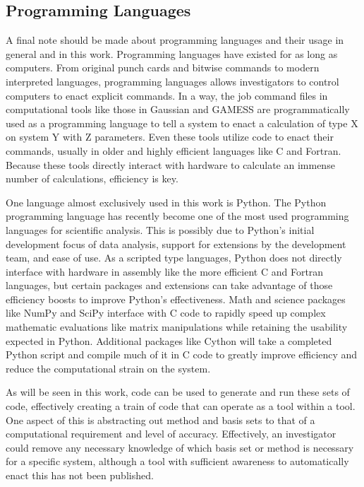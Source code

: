 \subsection{Programming Languages}

A final note should be made about programming languages and their usage in general and in this work.
Programming languages have existed for as long as computers.
From original punch cards and bitwise commands to modern interpreted languages, programming languages allows investigators to control computers to enact explicit commands.
In a way, the job command files in computational tools like those in Gaussian and GAMESS are programmatically used as a programming language to tell a system to enact a calculation of type X on system Y with Z parameters.
Even these tools utilize code to enact their commands, usually in older and highly efficient languages like C and Fortran.
Because these tools directly interact with hardware to calculate an immense number of calculations, efficiency is key.

One language almost exclusively used in this work is Python.\cite{Python} 
The Python programming language has recently become one of the most used programming languages for scientific analysis.
This is possibly due to Python's initial development focus of data analysis, support for extensions by the development team, and ease of use.
As a scripted type languages, Python does not directly interface with hardware in assembly like the more efficient C and Fortran languages, but certain packages and extensions can take advantage of those efficiency boosts to improve Python's effectiveness.
Math and science packages like NumPy\cite{NumPy} and SciPy\cite{SciPy} interface with C code to rapidly speed up complex mathematic evaluations like matrix manipulations while retaining the usability expected in Python.
Additional packages like Cython\cite{Cython} will take a completed Python script and compile much of it in C code to greatly improve efficiency and reduce the computational strain on the system.

As will be seen in this work, code can be used to generate and run these sets of code, effectively creating a train of code that can operate as a tool within a tool. 
One aspect of this is abstracting out method and basis sets to that of a computational requirement and level of accuracy.
Effectively, an investigator could remove any necessary knowledge of which basis set or method is necessary for a specific system, although a tool with sufficient awareness to automatically enact this has not been published.














